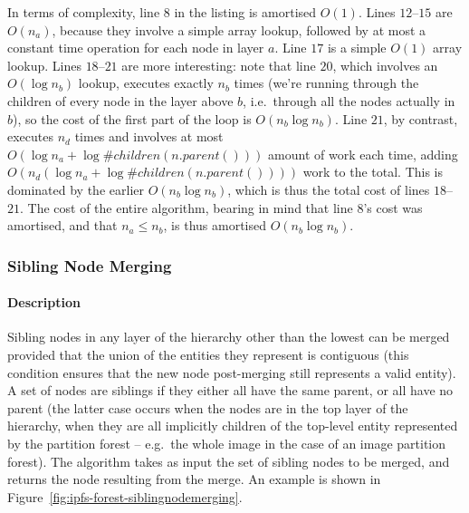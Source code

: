 In terms of complexity, line $8$ in the listing is amortised $O(1)$. Lines $12$--$15$ are $O(n_a)$, because they involve a simple array lookup, followed by at most a constant time operation for each node in layer $a$. Line $17$ is a simple $O(1)$ array lookup. Lines $18$--$21$ are more interesting: note that line $20$, which involves an $O(\log n_b)$ lookup, executes exactly $n_b$ times (we're running through the children of every node in the layer above $b$, i.e.~through all the nodes actually in $b$), so the cost of the first part of the loop is $O(n_b \log n_b)$. Line $21$, by contrast, executes $n_d$ times and involves at most $O(\log n_a + \log \#\mathit{children}(\mathit{n.parent()}))$ amount of work each time, adding $O(n_d (\log n_a + \log \#\mathit{children}(\mathit{n.parent()})))$ work to the total. This is dominated by the earlier $O(n_b \log n_b)$, which is thus the total cost of lines $18$--$21$. The cost of the entire algorithm, bearing in mind that line $8$'s cost was amortised, and that $n_a \le n_b$, is thus amortised $O(n_b \log n_b)$.


\afterpage{\clearpage}
\newpage

\subsubsection{Sibling Node Merging}


\paragraph{Description}

Sibling nodes in any layer of the hierarchy other than the lowest can be merged provided that the union of the entities they represent is contiguous (this condition ensures that the new node post-merging still represents a valid entity). A set of nodes are siblings if they either all have the same parent, or all have no parent (the latter case occurs when the nodes are in the top layer of the hierarchy, when they are all implicitly children of the top-level entity represented by the partition forest -- e.g.~the whole image in the case of an image partition forest). The algorithm takes as input the set of sibling nodes to be merged, and returns the node resulting from the merge. An example is shown in Figure~\ref{fig:ipfs-forest-siblingnodemerging}.

